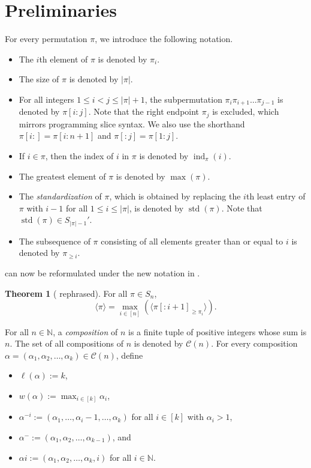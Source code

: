 \documentclass[12pt]{amsart}
\DeclareMathOperator{\ind}{ind}
\DeclareMathOperator{\std}{std}
\newcommand{\met}[1]{\langle #1\rangle}
\theoremstyle{definition}
\newtheorem{theorem}{Theorem}[section]
\begin{document}
\section{Preliminaries}
For every permutation $\pi$, we introduce the following notation.
\begin{itemize}
\item The $i$th element of $\pi$ is denoted by $\pi_i$.
\item The size of $\pi$ is denoted by $|\pi|$.
\item For all integers $1\le i<j\le |\pi|+1$, the subpermutation $\pi_i\pi_{i+1}\dots\pi_{j-1}$ is denoted by $\pi[i:j]$. Note that the right endpoint $\pi_j$ is excluded, which mirrors programming slice syntax. We also use the shorthand $\pi[i:]=\pi[i:n+1]$ and $\pi[:j]=\pi[1:j]$.
\item If $i\in\pi$, then the index of $i$ in $\pi$ is denoted by $\ind_{\pi}(i)$.
\item The greatest element of $\pi$ is denoted by $\max(\pi)$.
\item The \emph{standardization} of $\pi$, which is obtained by replacing the $i$th least entry of $\pi$ with $i-1$ for all $1\le i\le |\pi|$, is denoted by $\std(\pi)$. Note that $\std(\pi)\in S_{|\pi|-1}'$.
\item The subsequence of $\pi$ consisting of all elements greater than or equal to $i$ is denoted by $\pi_{\ge i}$.
\end{itemize}
 can now be reformulated under the new notation in .
\begin{theorem}[ rephrased]\label{thm:restated}
For all $\pi\in S_n$, \[\met{\pi} = \max_{i\in [n]}(\met{\pi[:i+1]_{\ge\pi_i}}).\]
\end{theorem}
For all $n\in\mathbb{N}$, a \textit{composition} of $n$ is a finite tuple of positive integers whose sum is $n$. The set of all compositions of $n$ is denoted by $\mathcal{C}(n)$. For every composition $\alpha=(\alpha_1,\alpha_2,\dots,\alpha_k)\in\mathcal{C}(n)$, define 
\begin{itemize}
\item $\ell(\alpha):=k$,
\item $w(\alpha):=\max_{i\in[k]} \alpha_i$,
\item $\alpha^{-i}:=(\alpha_1,\dots,\alpha_{i}-1,\dots,\alpha_k)$ for all $i\in [k]$ with $\alpha_{i}>1$,
\item $\alpha^-:=(\alpha_1,\alpha_2,\dots,\alpha_{k-1})$, and
\item $\alpha i:=(\alpha_1,\alpha_2,\dots,\alpha_k,i)$ for all $i\in\mathbb{N}$.
\end{itemize}
\end{document}
